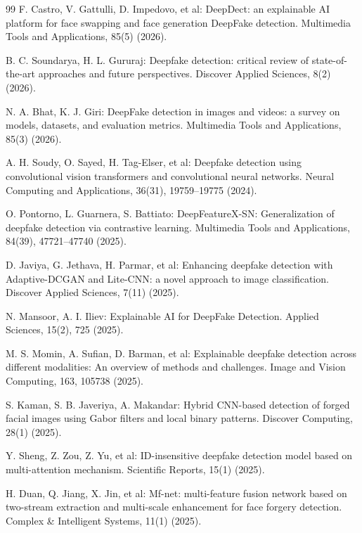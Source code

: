 \documentclass[runningheads]{llncs}
\begin{document}
\begin{thebibliography}{99}
F. Castro, V. Gattulli, D. Impedovo, et al: DeepDect: an explainable AI platform for face swapping and face generation DeepFake detection. Multimedia Tools and Applications, 85(5) (2026). 

B. C. Soundarya, H. L. Gururaj: Deepfake detection: critical review of state-of-the-art approaches and future perspectives. Discover Applied Sciences, 8(2) (2026). 

N. A. Bhat, K. J. Giri: DeepFake detection in images and videos: a survey on models, datasets, and evaluation metrics. Multimedia Tools and Applications, 85(3) (2026). 

A. H. Soudy, O. Sayed, H. Tag-Elser, et al: Deepfake detection using convolutional vision transformers and convolutional neural networks. Neural Computing and Applications, 36(31), 19759–19775 (2024). 

O. Pontorno, L. Guarnera, S. Battiato: DeepFeatureX-SN: Generalization of deepfake detection via contrastive learning. Multimedia Tools and Applications, 84(39), 47721–47740 (2025). 

D. Javiya, G. Jethava, H. Parmar, et al: Enhancing deepfake detection with Adaptive-DCGAN and Lite-CNN: a novel approach to image classification. Discover Applied Sciences, 7(11) (2025). 

N. Mansoor, A. I. Iliev: Explainable AI for DeepFake Detection. Applied Sciences, 15(2), 725 (2025). 

M. S. Momin, A. Sufian, D. Barman, et al: Explainable deepfake detection across different modalities: An overview of methods and challenges. Image and Vision Computing, 163, 105738 (2025). 

S. Kaman, S. B. Javeriya, A. Makandar: Hybrid CNN-based detection of forged facial images using Gabor filters and local binary patterns. Discover Computing, 28(1) (2025). 

Y. Sheng, Z. Zou, Z. Yu, et al: ID-insensitive deepfake detection model based on multi-attention mechanism. Scientific Reports, 15(1) (2025). 

H. Duan, Q. Jiang, X. Jin, et al: Mf-net: multi-feature fusion network based on two-stream extraction and multi-scale enhancement for face forgery detection. Complex & Intelligent Systems, 11(1) (2025). 


\end{thebibliography}
\end{document}
